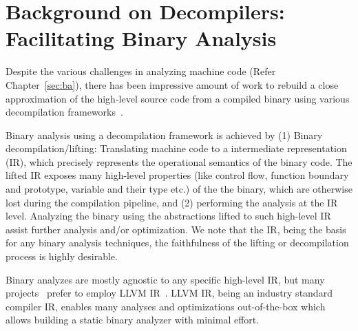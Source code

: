 \chapter{Background on Decompilers: Facilitating Binary Analysis}\label{sec:decompilers}

Despite the various challenges in analyzing machine code (Refer
    Chapter~\ref{sec:ba}), there has been impressive amount of work to rebuild
a close approximation of the high-level source code from a compiled binary
using various decompilation
frameworks~\cite{McSema:Recon14,Remill,Angr1,BAP:CAV11,Radare2,FCD,BitBlaze:2008,hexray,Fokin:2011,eschulte2018bed,katz2018rnn,Schwartz:2013,IDA,mctoll,revgen}.

Binary analysis using a decompilation framework is achieved by (1) Binary
decompilation/lifting: Translating machine code to a intermediate
representation (IR), which precisely represents the operational semantics of
the binary code. The lifted IR exposes many high-level properties (like control
    flow, function boundary and prototype, variable and their type etc.) of the
the binary, which are otherwise lost during the compilation pipeline, and (2)
  performing the analysis at the IR level.  Analyzing the binary using the
  abstractions lifted to such high-level IR assist further analysis and/or
  optimization. We note that the IR, being the basis for any binary analysis
  techniques, the faithfulness of the lifting or decompilation process is
  highly desirable. 

Binary analyzes are mostly agnostic to any specific high-level IR, but many
projects~\cite{McSema:Recon14,Remill,FCD,reopt,mctoll} prefer to employ LLVM
IR~\cite{Lattner:2004}. LLVM IR, being an industry standard compiler IR,
  enables many analyses and optimizations out-of-the-box which allows building
  a static binary analyzer with minimal effort.

